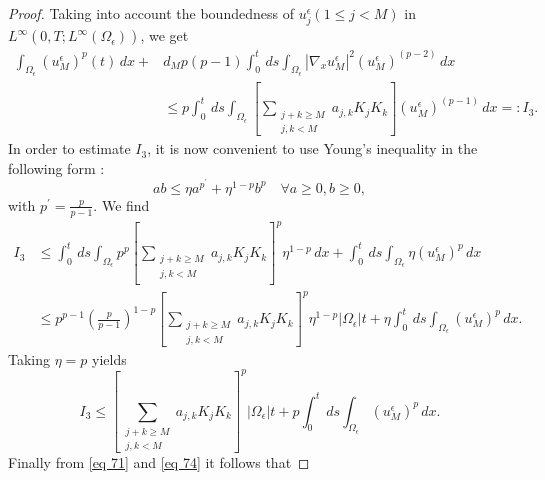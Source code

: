 \begin{proof}
Taking into account the boundedness of $u_{j}^{\epsilon}(1 \leq j<M)$ in $L^{\infty}\left(0, T ; L^{\infty}\left(\Omega_{\epsilon}\right)\right)$, we get
\begin{equation}
  \begin{aligned}
\int_{\Omega_{\epsilon}}\left(u_{M}^{\epsilon}\right)^{p}(t) \, {d} x+& d_{M} p(p-1) \int_{0}^{t} \, d  s \int_{\Omega_{\epsilon}}\left|\nabla_{x} u_{M}^{\epsilon}\right|^{2}\left(u_{M}^{\epsilon}\right)^{(p-2)} \, {d} x \\
& \leq p \int_{0}^{t} \, d  s \int_{\Omega_{\epsilon}}\left[\sum_{\substack{j+k \geq M \\
j,k<M}} a_{j, k} K_{j} K_{k}\right]\left(u_{M}^{\epsilon}\right)^{(p-1)} \, {d} x =: I_{3}.
\end{aligned}
\label{eq 71}\end{equation}
In order to estimate $I_{3}$, it is now convenient to use Young's inequality in the following form \cite{Brezis_2011}:
\begin{equation}
  a b \leq \eta a^{p^{\prime}}+\eta^{1-p}b^{p} \quad \forall a \geq 0, b \geq 0,
\label{eq 72}\end{equation}
with $p^{\prime}=\frac{p}{p-1}$. We find
\begin{equation}
  \begin{aligned}
I_{3} & \leq \int_{0}^{t} \, d  s \int_{\Omega_{\epsilon}} p^{p}\left[\sum_{\substack{j+k \geq M \\
j,k<M \\}} a_{j, k} K_{j} K_{k}\right]^{p} \eta^{1-p} \, d  x+\int_{0}^{t} \, d  s \int_{\Omega_{\epsilon}} \eta\left(u_{M}^{\epsilon}\right)^{p} \, d  x \\
& \leq p^{p-1}\left(\frac{p}{p-1}\right)^{1-p}\left[\sum_{\substack{j+k \geq M \\
j,k<M}} a_{j, k} K_{j} K_{k}\right]^{p} \eta^{1-p}\left|\Omega_{\epsilon}\right| t+\eta \int_{0}^{t} \, d  s \int_{\Omega_{\epsilon}}\left(u_{M}^{\epsilon}\right)^{p} \, d  x.
\end{aligned}
\label{eq 73}\end{equation}
Taking $\eta=p$ yields
\begin{equation}
  I_{3} \leq\left[\sum_{\substack{j+k \geq M \\
j,k<M}} a_{j, k} K_{j} K_{k}\right]^{p}\left|\Omega_{\epsilon}\right| t+p \int_{0}^{t} \, d  s \int_{\Omega_{\epsilon}}\left(u_{M}^{\epsilon}\right)^{p} \, d  x.
\label{eq 74}\end{equation}
Finally from \eqref{eq 71} and \eqref{eq 74} it follows that

\end{proof}
